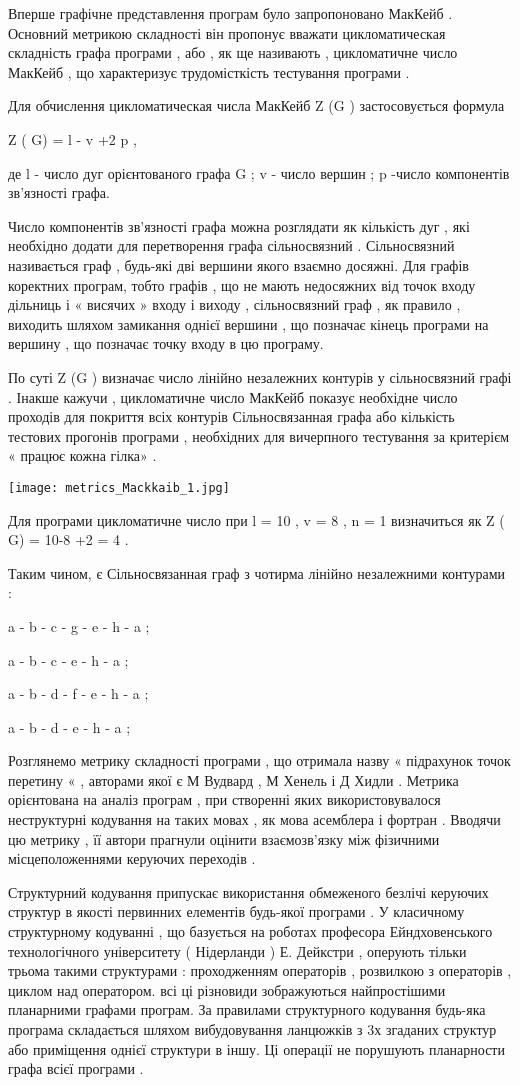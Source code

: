 Вперше графічне представлення програм було запропоновано МакКейб . Основний метрикою складності він пропонує вважати цикломатическая складність графа програми , або , як ще називають , цикломатичне число МакКейб , що характеризує трудомісткість тестування програми .

Для обчислення цикломатическая числа МакКейб Z (G ) застосовується формула

Z ( G) = l - v +2 p ,

де l - число дуг орієнтованого графа G ; v - число вершин ; p -число компонентів зв'язності графа.

Число компонентів зв'язності графа можна розглядати як кількість дуг , які необхідно додати для перетворення графа сільносвязний . Сільносвязний називається граф , будь-які дві вершини якого взаємно досяжні. Для графів коректних програм, тобто графів , що не мають недосяжних від точок входу дільниць і « висячих » входу і виходу , сільносвязний граф , як правило , виходить шляхом замикання однієї вершини , що позначає кінець програми на вершину , що позначає точку входу в цю програму.

По суті Z (G ) визначає число лінійно незалежних контурів у сільносвязний графі . Інакше кажучи , цикломатичне число МакКейб показує необхідне число проходів для покриття всіх контурів Сільносвязанная графа або кількість тестових прогонів програми , необхідних для вичерпного тестування за критерієм « працює кожна гілка» .

\texttt{[image: metrics\_Mackkaib\_1.jpg]}

Для програми цикломатичне число при l = 10 , v = 8 , n = 1 визначиться як Z ( G) = 10-8 +2 = 4 .

Таким чином, є Сільносвязанная граф з чотирма лінійно незалежними контурами :

a - b - c - g - e - h - a ;

a - b - c - e - h - a ;

a - b - d - f - e - h - a ;

a - b - d - e - h - a ;

Розглянемо метрику складності програми , що отримала назву « підрахунок точок перетину « , авторами якої є М Вудвард , М Хенель і Д Хидли . Метрика орієнтована на аналіз програм , при створенні яких використовувалося неструктурні кодування на таких мовах , як мова асемблера і фортран . Вводячи цю метрику , її автори прагнули оцінити взаємозв'язку між фізичними місцеположеннями керуючих переходів .

Структурний кодування припускає використання обмеженого безлічі керуючих структур в якості первинних елементів будь-якої програми . У класичному структурному кодуванні , що базується на роботах професора Ейндховенського технологічного університету ( Нідерланди ) Е. Дейкстри , оперують тільки трьома такими структурами : проходженням операторів , розвилкою з операторів , циклом над оператором. всі ці різновиди зображуються найпростішими планарними графами програм. За правилами структурного кодування будь-яка програма складається шляхом вибудовування ланцюжків з 3х згаданих структур або приміщення однієї структури в іншу. Ці операції не порушують планарности графа всієї програми .

